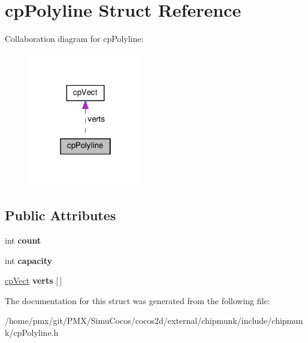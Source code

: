 \hypertarget{structcpPolyline}{}\section{cp\+Polyline Struct Reference}
\label{structcpPolyline}


Collaboration diagram for cp\+Polyline\+:
\nopagebreak
\begin{figure}[H]
\begin{center}
\leavevmode
\includegraphics[width=142pt]{structcpPolyline__coll__graph}
\end{center}
\end{figure}
\subsection*{Public Attributes}
\begin{DoxyCompactItemize}
\item 
\mbox{\label{structcpPolyline_a15fab291947d004468393ad00d1cc37d}} 
int {\bfseries count}
\item 
\mbox{\label{structcpPolyline_a982538e2e60e8eb6952b756c3940d15f}} 
int {\bfseries capacity}
\item 
\mbox{\label{structcpPolyline_a2f14d73c949e9bdbe6304646c81e8958}} 
\hyperlink{structcpVect}{cp\+Vect} {\bfseries verts} \mbox{[}$\,$\mbox{]}
\end{DoxyCompactItemize}


The documentation for this struct was generated from the following file\+:\begin{DoxyCompactItemize}
\item 
/home/pmx/git/\+P\+M\+X/\+Simu\+Cocos/cocos2d/external/chipmunk/include/chipmunk/cp\+Polyline.\+h\end{DoxyCompactItemize}
